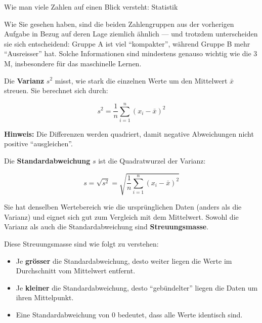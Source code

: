 \begin{lpu}{Wie man viele Zahlen auf einen Blick versteht: Statistik}
\begin{aufgabe}{1}
\end{aufgabe}


Wie Sie gesehen haben, sind die beiden Zahlengruppen aus der vorherigen Aufgabe in Bezug auf deren Lage ziemlich ähnlich — und trotzdem unterscheiden sie sich entscheidend: Gruppe A ist viel ``kompakter'', während Gruppe B mehr ``Ausreisser'' hat. Solche Informationen sind mindestens genauso wichtig wie die 3 M, insbesondere für das maschinelle Lernen.

\begin{theorie}
Die \textbf{Varianz} $s^2$ misst, wie stark die einzelnen Werte um den Mittelwert $\bar{x}$ streuen. Sie berechnet sich durch:

\[
s^2 = \frac{1}{n} \sum_{i=1}^{n} (x_i - \bar{x})^2
\]

\textbf{Hinweis:} Die Differenzen werden quadriert, damit negative Abweichungen nicht positive ``ausgleichen''.

\vspace{0.5em}
Die \textbf{Standardabweichung} $s$ ist die Quadratwurzel der Varianz:

\[
s = \sqrt{s^2} = \sqrt{ \frac{1}{n} \sum_{i=1}^{n} (x_i - \bar{x})^2 }
\]

Sie hat denselben Wertebereich wie die ursprünglichen Daten (anders als die Varianz) und eignet sich gut zum Vergleich mit dem Mittelwert. Sowohl die Varianz als auch die Standardabweichung sind \textbf{Streuungsmasse}.
\end{theorie}

Diese Streuungsmasse sind wie folgt zu verstehen:
\begin{itemize}
  \item Je \textbf{grösser} die Standardabweichung, desto weiter liegen die Werte im Durchschnitt vom Mittelwert entfernt.
  \item Je \textbf{kleiner} die Standardabweichung, desto ``gebündelter'' liegen die Daten um ihren Mittelpunkt.
  \item Eine Standardabweichung von $0$ bedeutet, dass alle Werte identisch sind.
\end{itemize}

\begin{figure}[h]
\centering
{}
\end{figure}
\end{lpu}
